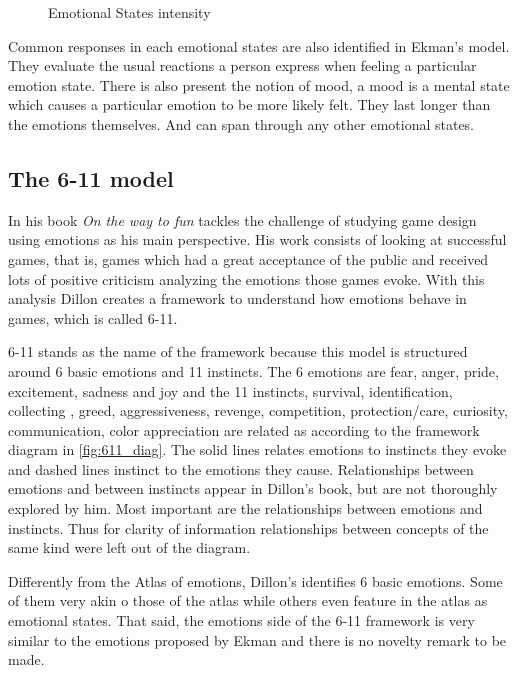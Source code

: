 \begin{figure}[ht]
    \caption{Emotional States intensity}
    \label{fig:emotionalstates}
\end{figure}


Common responses in each emotional states are also identified in Ekman's model. They evaluate the usual reactions a person express when feeling a particular emotion state. There is also present the notion of mood, a mood is a mental state which causes a particular emotion to be more likely felt. They last longer than the emotions themselves. And can span through any other emotional states.


\FloatBarrier
\subsection{The 6-11 model}

In his book \textit{On the way to fun} \citeauthor{dillon_way_2010} tackles the challenge of studying game design using emotions as his main perspective. His work consists of looking at successful games, that is, games which had a great acceptance of the public and received lots of positive criticism analyzing the emotions those games evoke. With this analysis Dillon creates a framework to understand how emotions behave in games, which is called 6-11.

6-11 stands as the name of the framework because this model is structured around 6 basic emotions and 11 instincts. The 6 emotions are fear, anger, pride, excitement, sadness and joy and the 11 instincts, survival, identification, collecting
, greed, aggressiveness, revenge, competition, protection/care, curiosity, communication, color appreciation are related as according to the framework diagram in \autoref{fig:611_diag}. The solid lines relates emotions to instincts they evoke and dashed lines instinct to the emotions they cause. Relationships between emotions and between instincts appear in Dillon's book, but are not thoroughly explored by him. Most important are the relationships between emotions and instincts. Thus for clarity of information relationships between concepts of the same kind were left out of the diagram. 




Differently from the Atlas of emotions, Dillon's identifies 6 basic emotions. Some of them very akin o those of the atlas while others even feature in the atlas as emotional states. That said, the emotions side of the 6-11 framework is very similar to the emotions proposed by Ekman and there is no novelty remark to be made.


